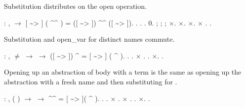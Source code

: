 \documentclass[12pt]{report}
\begin{document}
Substitution distributes on the open operation. 
\begin{coqdoccode}
\coqdocemptyline
\coqdocnoindent
{}  : \coqdockw{\ensuremath{\forall}}    ,   \ensuremath{\rightarrow} \coqdoceol
\coqdocindent{1.00em}
[ \~{}> ] ( \^{}\^{} ) = ([ \~{}> ]) \^{}\^{} ([ \~{}> ]).\coqdoceol
\coqdocnoindent
{}.\coqdoceol
\coqdocindent{1.00em}
.  .  0.\coqdoceol
\coqdocindent{1.00em}
 ; ; ; \ensuremath{\times}.\coqdoceol
\coqdocindent{1.00em}
\ensuremath{\times}. \ensuremath{\times}. \ensuremath{\times} .\coqdoceol
\coqdocnoindent
{}.\coqdoceol
\coqdocemptyline
\end{coqdoccode}
Substitution and open\_var for distinct names commute. 
\begin{coqdoccode}
\coqdocemptyline
\coqdocnoindent
{}  : \coqdockw{\ensuremath{\forall}}    ,  \ensuremath{\not=}  \ensuremath{\rightarrow}   \ensuremath{\rightarrow}\coqdoceol
\coqdocindent{1.00em}
([ \~{}> ]) \^{}  = [ \~{}> ] ( \^{} ).\coqdoceol
\coqdocnoindent
{}.   . \ensuremath{\times} . . \ensuremath{\times}. .\coqdoceol
\coqdocemptyline
\end{coqdoccode}
Opening up an abstraction of body  with a term  is the same as opening
  up the abstraction with a fresh name  and then substituting  for . 
\begin{coqdoccode}
\coqdocemptyline
\coqdocnoindent
{}  : \coqdockw{\ensuremath{\forall}}   , \coqdoceol
\coqdocindent{1.00em}
  ( ) \ensuremath{\rightarrow}   \ensuremath{\rightarrow}\coqdoceol
\coqdocindent{1.00em}
 \^{}\^{}  = [ \~{}> ]( \^{} ).\coqdoceol
\coqdocnoindent
{}.\coqdoceol
\coqdocindent{1.00em}
  . \ensuremath{\times} .\coqdoceol
\coqdocindent{1.00em}
\ensuremath{\times} . . \ensuremath{\times}.\coqdoceol
\coqdocnoindent
{}.\coqdoceol
\coqdocemptyline
\end{coqdoccode}
\end{document}

